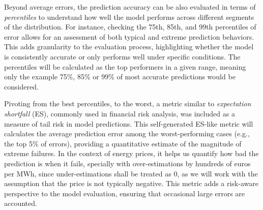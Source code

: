 \documentclass[12pt]{report} %
\begin{document}
Beyond average errors, the prediction accuracy can be also evaluated in terms of \textit{percentiles} to understand how well the model performs across different segments of the distribution. For instance, checking the 75th, 85th, and 99th percentiles of error allows for an assessment of both typical and extreme prediction behaviors. This adds granularity to the evaluation process, highlighting whether the model is consistently accurate or only performs well under specific conditions. The percentiles will be calculated as the top performers in a given range, meaning only the example 75\%, 85\% or 99\% of most accurate predictions would be considered.

Pivoting from the best percentiles, to the worst, a metric similar to \textit{expectation shortfall} (ES), commonly used in financial risk analysis, was included as a measure of tail risk in model predictions. This self-generated ES-like metric will calculates the average prediction error among the worst-performing cases (e.g., the top 5\% of errors), providing a quantitative estimate of the magnitude of extreme failures. In the context of energy prices, it helps us quantify how bad the prediction is when it fails, specially with over-estimations by hundreds of euros per MWh, since under-estimations shall be treated as 0, as we will work with the assumption that the price is not typically negative. This metric adds a risk-aware perspective to the model evaluation, ensuring that occasional large errors are accounted.


\end{document}
